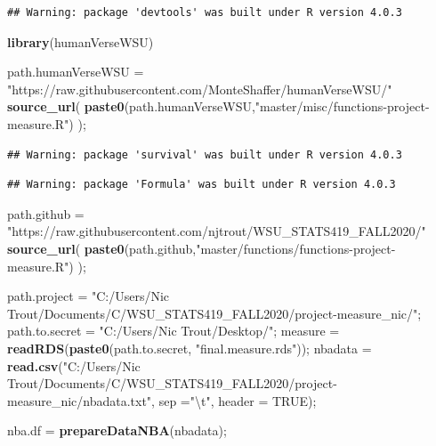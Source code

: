 \documentclass[]{article}
\newenvironment{Shaded}{\begin{snugshade}}{\end{snugshade}}
\newcommand{\CharTok}[1]{\textcolor[rgb]{0.31,0.60,0.02}{#1}}
\newcommand{\DataTypeTok}[1]{\textcolor[rgb]{0.13,0.29,0.53}{#1}}
\newcommand{\KeywordTok}[1]{\textcolor[rgb]{0.13,0.29,0.53}{\textbf{#1}}}
\newcommand{\NormalTok}[1]{#1}
\newcommand{\OtherTok}[1]{\textcolor[rgb]{0.56,0.35,0.01}{#1}}
\newcommand{\StringTok}[1]{\textcolor[rgb]{0.31,0.60,0.02}{#1}}
\begin{document}
\begin{verbatim}
## Warning: package 'devtools' was built under R version 4.0.3
\end{verbatim}

\begin{Shaded}
\begin{Highlighting}[]
\KeywordTok{library}\NormalTok{(humanVerseWSU)}

\NormalTok{path.humanVerseWSU =}\StringTok{ "https://raw.githubusercontent.com/MonteShaffer/humanVerseWSU/"}
\KeywordTok{source\_url}\NormalTok{( }\KeywordTok{paste0}\NormalTok{(path.humanVerseWSU,}\StringTok{"master/misc/functions{-}project{-}measure.R"}\NormalTok{) );}
\end{Highlighting}
\end{Shaded}

\begin{verbatim}
## Warning: package 'survival' was built under R version 4.0.3
\end{verbatim}

\begin{verbatim}
## Warning: package 'Formula' was built under R version 4.0.3
\end{verbatim}

\begin{Shaded}
\begin{Highlighting}[]
\NormalTok{path.github =}\StringTok{ "https://raw.githubusercontent.com/njtrout/WSU\_STATS419\_FALL2020/"}
\KeywordTok{source\_url}\NormalTok{( }\KeywordTok{paste0}\NormalTok{(path.github,}\StringTok{"master/functions/functions{-}project{-}measure.R"}\NormalTok{) );}

\NormalTok{path.project =}\StringTok{ "C:/Users/Nic Trout/Documents/C/WSU\_STATS419\_FALL2020/project{-}measure\_nic/"}\NormalTok{;}
\NormalTok{path.to.secret =}\StringTok{ "C:/Users/Nic Trout/Desktop/"}\NormalTok{;}
\NormalTok{measure =}\StringTok{ }\KeywordTok{readRDS}\NormalTok{(}\KeywordTok{paste0}\NormalTok{(path.to.secret, }\StringTok{"final.measure.rds"}\NormalTok{));}
\NormalTok{nbadata =}\StringTok{ }\KeywordTok{read.csv}\NormalTok{(}\StringTok{"C:/Users/Nic Trout/Documents/C/WSU\_STATS419\_FALL2020/project{-}measure\_nic/nbadata.txt"}\NormalTok{, }\DataTypeTok{sep =}\StringTok{"}\CharTok{\textbackslash{}t}\StringTok{"}\NormalTok{, }\DataTypeTok{header =} \OtherTok{TRUE}\NormalTok{);}

\NormalTok{nba.df =}\StringTok{ }\KeywordTok{prepareDataNBA}\NormalTok{(nbadata);}
\end{Highlighting}
\end{Shaded}
\end{document}
